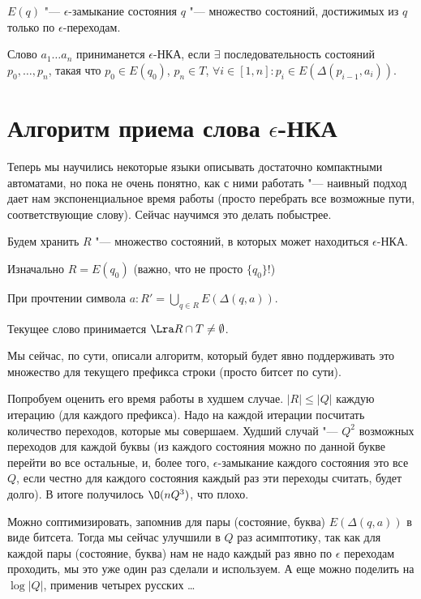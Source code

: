 \begin{Def}
$E(q)$ "--- $\epsilon$-замыкание состояния $q$ "--- множество состояний, достижимых из $q$ только по $\epsilon$-переходам.
\end{Def}


\begin{Def}
Слово $a_1 \dots a_n$ приниманется $\epsilon$-НКА, если $\exists$ последовательность состояний $p_0, \dots, p_n$, такая что
$p_0 \in E(q_0)$, $p_n \in T$, $\forall i \in [1, n]: p_i \in E(\Delta(p_{i-1}, a_i))$.
\end{Def}

\section{Алгоритм приема слова \texorpdfstring{$\epsilon$}{epsilon}-НКА}
Теперь мы научились некоторые языки описывать достаточно компактными автоматами, но пока не очень понятно, как с ними работать "--- 
наивный подход дает нам экспоненциальное время работы (просто перебрать все возможные пути, соответствующие слову). Сейчас научимся это делать побыстрее.

Будем хранить $R$ "---  множество состояний, в которых может находиться $\epsilon$-НКА. 

Изначально $R = E(q_0)$ (важно, что не просто $\{q_0\}$!)

При прочтении символа $a: R' =  \bigcup\limits_{q \in R} E(\Delta(q, a))$.

Текущее слово принимается $\Lra R \cap T \neq \emptyset$.

Мы сейчас, по сути, описали алгоритм, который будет явно поддерживать это множество для текущего префикса строки (просто битсет по сути).

Попробуем оценить его время работы в худшем случае.
$|R| \leqslant |Q|$ каждую итерацию (для каждого префикса). 
Надо на каждой итерации посчитать количество переходов, которые мы совершаем.
Худший случай "--- $Q^2$ возможных переходов для каждой буквы 
(из каждого состояния можно по данной букве перейти во все остальные, и, более того, $\epsilon$-замыкание каждого состояния это все $Q$, если честно для каждого состояния каждый раз эти переходы считать, будет долго).
В итоге получилось $\O(nQ^3)$, что плохо.

Можно соптимизировать, запомнив для пары (состояние, буква) $E(\Delta(q, a))$ в виде битсета. 
Тогда мы сейчас улучшили в $Q$ раз асимптотику, так как для каждой пары (состояние, буква) нам не надо каждый раз явно по $\epsilon$ переходам проходить, мы это уже один раз сделали и используем.
А еще можно поделить на $\log |Q|$, применив четырех русских \dots

